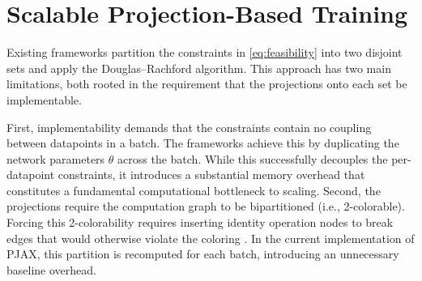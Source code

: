 \chapter{Scalable Projection-Based Training}

Existing frameworks \cite{elser2019learning,bergmeister2025projection} partition the constraints in \eqref{eq:feasibility} into two disjoint sets and apply the Douglas--Rachford algorithm. This approach has two main limitations, both rooted in the requirement that the projections onto each set be implementable. 

First, implementability demands that the constraints contain no coupling between datapoints in a batch. The frameworks achieve this by duplicating the network parameters $\theta$ across the batch. While this successfully decouples the per-datapoint constraints, it introduces a substantial memory overhead that constitutes a fundamental computational bottleneck to scaling. Second, the projections require the computation graph to be bipartitioned (i.e., 2-colorable). Forcing this 2-colorability requires inserting identity operation nodes to break edges that would otherwise violate the coloring \cite{bergmeister2025projection}. In the current implementation of PJAX, this partition is recomputed for each batch, introducing an unnecessary baseline overhead.

